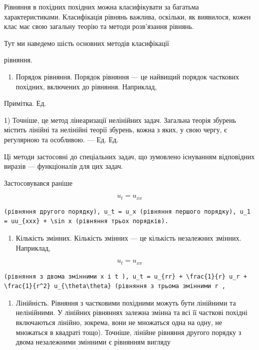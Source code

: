 \documentclass[
  ukrainian,
]{article}
\providecommand{\tightlist}{%
  \setlength{\itemsep}{0pt}\setlength{\parskip}{0pt}}
\begin{document}
Рівняння в похідних похідних можна класифікувати за багатьма
характеристиками. Класифікація рівнянь важлива, оскільки, як виявилося,
кожен клас має свою загальну теорію та методи розв'язання рівнянь.

Тут ми наведемо шість основних методів класифікації

рівняння.

\begin{enumerate}
\def\labelenumi{\arabic{enumi}.}
\tightlist
\item
  Порядок рівняння. Порядок рівняння --- це найвищий порядок часткових
  похідних, включених до рівняння. Наприклад,
\end{enumerate}

Примітка. Ед.

1) Точніше, це метод лінеаризації нелінійних задач. Загальна теорія
збурень містить лінійні та нелінійні теорії збурень, кожна з яких, у
свою чергу, є регулярною та особливою. --- Ед. Ед.

Ці методи застосовні до спеціальних задач, що зумовлено існуванням
відповідних виразів --- функціоналів для цих задач.

Застосовувався раніше

\[u_t = u_{xx}\]

\begin{verbatim}
(рівняння другого порядку), u_t = u_x (рівняння першого порядку), u_1 = uu_{xxx} + \sin x (рівняння трьох порядків).
\end{verbatim}

\begin{enumerate}
\def\labelenumi{\arabic{enumi}.}
\setcounter{enumi}{1}
\tightlist
\item
  Кількість змінних. Кількість змінних --- це кількість незалежних
  змінних. Наприклад,
\end{enumerate}

\[u_t = u_{xx}\]

\begin{verbatim}
(рівняння з двома змінними x і t ), u_t = u_{rr} + \frac{1}{r} u_r + \frac{1}{r^2} u_{\theta\theta} (рівняння з трьома змінними r ,
\end{verbatim}

\begin{enumerate}
\def\labelenumi{\arabic{enumi}.}
\setcounter{enumi}{2}
\tightlist
\item
  Лінійність. Рівняння з частковими похідними можуть бути лінійними та
  нелінійними. У лінійних рівняннях залежна змінна та всі її часткові
  похідні включаються лінійно, зокрема, вони не множаться одна на одну,
  не множаться в квадраті тощо). Точніше, лінійне рівняння другого
  порядку з двома незалежними змінними є рівнянням вигляду
\end{enumerate}
\end{document}
